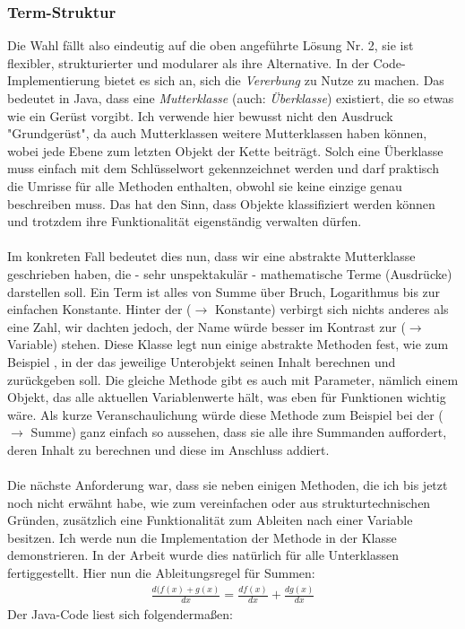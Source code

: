 \subsubsection{Term-Struktur}
Die Wahl fällt also eindeutig auf die oben angeführte Lösung Nr. 2, sie ist flexibler, strukturierter und modularer als ihre Alternative. In der Code-Implementierung bietet es sich an, sich die \textit{Vererbung} zu Nutze zu machen. Das bedeutet in Java, dass eine \textit{Mutterklasse} (auch: \textit{Überklasse}) existiert, die so etwas wie ein Gerüst vorgibt. Ich verwende hier bewusst nicht den Ausdruck "Grundgerüst", da auch Mutterklassen weitere Mutterklassen haben können, wobei jede Ebene zum letzten Objekt der Kette beiträgt. Solch eine Überklasse muss einfach mit dem Schlüsselwort  gekennzeichnet werden und darf praktisch die Umrisse für alle Methoden enthalten, obwohl sie keine einzige genau beschreiben muss. Das hat den Sinn, dass Objekte klassifiziert werden können und trotzdem ihre Funktionalität eigenständig verwalten dürfen.\\
\\
Im konkreten Fall bedeutet dies nun, dass wir eine abstrakte Mutterklasse  geschrieben haben, die - sehr unspektakulär - mathematische Terme (Ausdrücke) darstellen soll. Ein Term ist alles von Summe über Bruch, Logarithmus bis zur einfachen Konstante. Hinter der  ($\rightarrow$ Konstante) verbirgt sich nichts anderes als eine Zahl, wir dachten jedoch, der Name würde besser im Kontrast zur  ($\rightarrow$ Variable) stehen. Diese Klasse legt nun einige abstrakte Methoden fest, wie zum Beispiel , in der das jeweilige Unterobjekt seinen Inhalt berechnen und zurückgeben soll. Die gleiche Methode gibt es auch mit Parameter, nämlich einem Objekt, das alle aktuellen Variablenwerte hält, was eben für Funktionen wichtig wäre. Als kurze Veranschaulichung würde diese Methode zum Beispiel bei der  ($\rightarrow$ Summe) ganz einfach so aussehen, dass sie alle ihre Summanden auffordert, deren Inhalt zu berechnen und diese im Anschluss addiert.\\
\\
Die nächste Anforderung war, dass sie neben einigen Methoden, die ich bis jetzt noch nicht erwähnt habe, wie  zum vereinfachen oder  aus strukturtechnischen Gründen, zusätzlich eine Funktionalität zum Ableiten nach einer Variable besitzen. Ich werde nun die Implementation der Methode  in der Klasse  demonstrieren. In der Arbeit wurde dies natürlich für alle Unterklassen fertiggestellt. Hier nun die Ableitungsregel für Summen:
\begin{gather*}
\frac{d(f(x)+g(x)}{dx} = \frac{d f(x)}{dx}+\frac{d g(x)}{dx}
\end{gather*}
Der Java-Code liest sich folgendermaßen:\\

